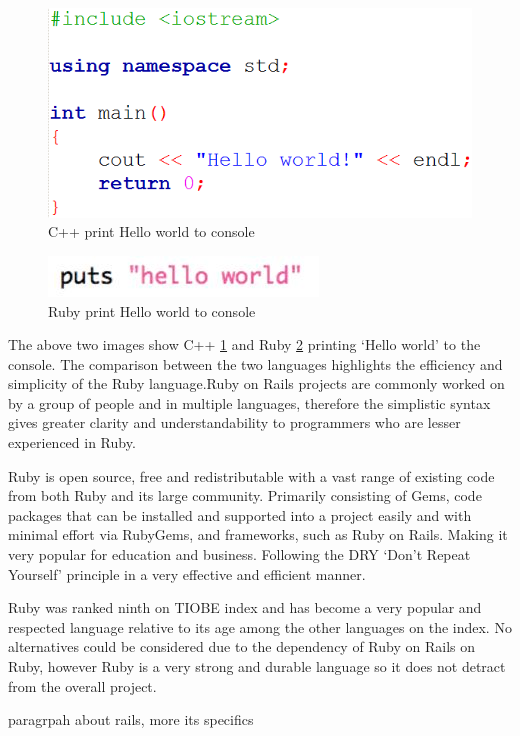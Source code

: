 \documentclass{article}
\begin{document}
\begin{figure}
\includegraphics[width=\linewidth]{screenshots/c++_hello_world}
\caption{C++ print Hello world to console}
\label{fig:c++print}
\end{figure}
\begin{figure}
\includegraphics[width=\linewidth]{screenshots/ruby_hello_world}
\caption{Ruby print Hello world to console}
\label{fig:rubyprint}
\end{figure}
\par The above two images show C++ \ref{fig:c++print} and Ruby \ref{fig:rubyprint} printing ‘Hello world’ to the console. The comparison between the two languages highlights the efficiency and simplicity of the Ruby language.Ruby on Rails projects are commonly worked on by a group of people and in multiple languages, therefore the simplistic syntax gives greater clarity and understandability to programmers who are lesser experienced in Ruby.\cite{AboutRuby}
\par Ruby is open source, free and redistributable with a vast range of existing code from both Ruby and its large community. Primarily consisting of Gems, code packages that can be installed and supported into a project easily and with minimal effort via RubyGems, and frameworks, such as Ruby on Rails. Making it very popular for education and business. Following the DRY ‘Don't Repeat Yourself’ principle in a very effective and efficient manner.\cite{AboutRuby}
\par Ruby was ranked ninth on TIOBE index\cite{TOBIE} and has become a very popular and respected language relative to its age among the other languages on the index. No alternatives could be considered due to the dependency of Ruby on Rails on Ruby, however Ruby is a very strong and durable language so it does not detract from the overall project.
\par paragrpah about rails, more its specifics
\end{document}
